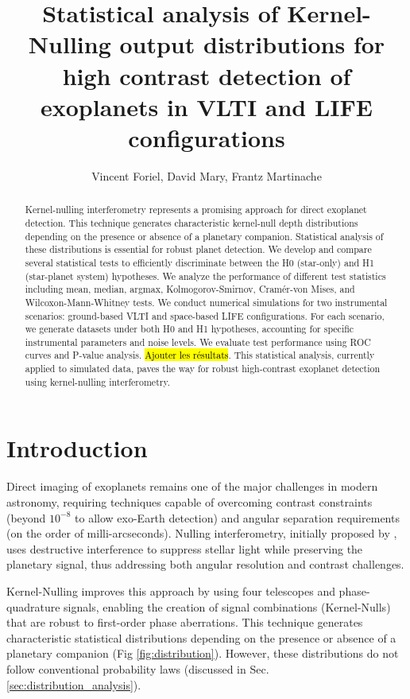 \documentclass{article}
\title{Statistical analysis of Kernel-Nulling output distributions for high contrast detection of exoplanets in VLTI and LIFE configurations}
\author{Vincent Foriel,
        David Mary,
        Frantz Martinache
       }
\begin{document}
\maketitle

\begin{abstract}
Kernel-nulling interferometry represents a promising approach for direct exoplanet detection. This technique generates characteristic kernel-null depth distributions depending on the presence or absence of a planetary companion. Statistical analysis of these distributions is essential for robust planet detection. We develop and compare several statistical tests to efficiently discriminate between the H0 (star-only) and H1 (star-planet system) hypotheses. We analyze the performance of different test statistics including mean, median, argmax, Kolmogorov-Smirnov, Cramér-von Mises, and Wilcoxon-Mann-Whitney tests. We conduct numerical simulations for two instrumental scenarios: ground-based VLTI and space-based LIFE configurations. For each scenario, we generate datasets under both H0 and H1 hypotheses, accounting for specific instrumental parameters and noise levels. We evaluate test performance using ROC curves and P-value analysis. \hl{Ajouter les résultats}. This statistical analysis, currently applied to simulated data, paves the way for robust high-contrast exoplanet detection using kernel-nulling interferometry.
\end{abstract}


\section{Introduction}

Direct imaging of exoplanets remains one of the major challenges in modern astronomy, requiring techniques capable of overcoming contrast constraints (beyond $10^{-8}$ to allow exo-Earth detection) and angular separation requirements (on the order of milli-arcseconds). Nulling interferometry, initially proposed by \cite{Bracewell1979}, uses destructive interference to suppress stellar light while preserving the planetary signal, thus addressing both angular resolution and contrast challenges.

Kernel-Nulling \cite{Martinache2018} improves this approach by using four telescopes and phase-quadrature signals, enabling the creation of signal combinations (Kernel-Nulls) that are robust to first-order phase aberrations. This technique generates characteristic statistical distributions depending on the presence or absence of a planetary companion (Fig \ref{fig:distribution}). However, these distributions do not follow conventional probability laws (discussed in Sec. \ref{sec:distribution_analysis}).
\end{document}
